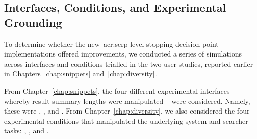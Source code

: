 \subsection{Interfaces, Conditions, and Experimental Grounding}\label{sec:serp:method:probscosts}
To determine whether the new~\gls{acr:serp} level stopping decision point implementations offered improvements, we conducted a series of simulations across interfaces and conditions trialled in the two user studies, reported earlier in Chapters~\ref{chap:snippets} and~\ref{chap:diversity}.

From Chapter~\ref{chap:snippets}, the four different experimental interfaces -- whereby result summary lengths were manipulated -- were considered. Namely, these were , ,  and . From Chapter~\ref{chap:diversity}, we also considered the four experimental conditions that manipulated the underlying system and searcher tasks: , ,  and .


